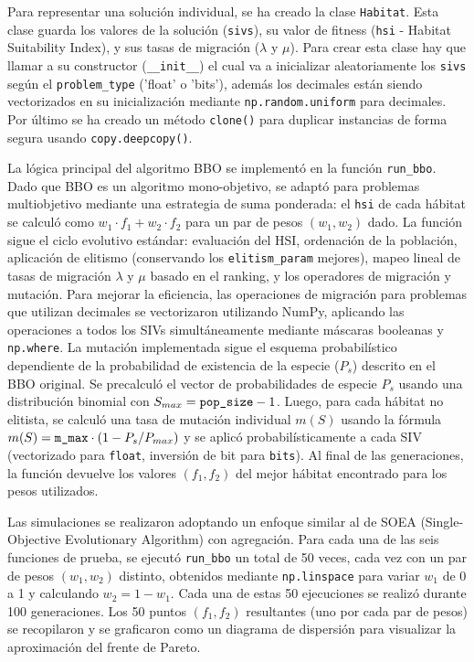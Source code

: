 Para representar una solución individual, se ha creado la clase \verb|Habitat|. Esta clase guarda los valores de la solución (\verb|sivs|), su valor de fitness (\verb|hsi| - Habitat Suitability Index), y sus tasas de migración ($\lambda$ y $\mu$). Para crear esta clase hay que llamar a su constructor (\verb|__init__|) el cual va a inicializar aleatoriamente los \verb|sivs| según el \verb|problem_type| ('float' o 'bits'), además los decimales están siendo vectorizados en su inicialización mediante \verb|np.random.uniform| para decimales. Por último se ha creado un método \verb|clone()| para duplicar instancias de forma segura usando \verb|copy.deepcopy()|.

La lógica principal del algoritmo BBO se implementó en la función \verb|run_bbo|. Dado que BBO es un algoritmo mono-objetivo, se adaptó para problemas multiobjetivo mediante una estrategia de suma ponderada: el \verb|hsi| de cada hábitat se calculó como $w_1 \cdot f_1 + w_2 \cdot f_2$ para un par de pesos $(w_1, w_2)$ dado. La función sigue el ciclo evolutivo estándar: evaluación del HSI, ordenación de la población, aplicación de elitismo (conservando los \verb|elitism_param| mejores), mapeo lineal de tasas de migración $\lambda$ y $\mu$ basado en el ranking, y los operadores de migración y mutación. Para mejorar la eficiencia, las operaciones de migración para problemas que utilizan decimales se vectorizaron utilizando NumPy, aplicando las operaciones a todos los SIVs simultáneamente mediante máscaras booleanas y \verb|np.where|. La mutación implementada sigue el esquema probabilístico dependiente de la probabilidad de existencia de la especie ($P_s$) descrito en el BBO original. Se precalculó el vector de probabilidades de especie $P_s$ usando una distribución binomial con $S_{max} = \verb|pop_size| - 1$. Luego, para cada hábitat no elitista, se calculó una tasa de mutación individual $m(S)$ usando la fórmula $m(S) = \verb|m_max| \cdot (1 - P_s / P_{max})$ y se aplicó probabilísticamente a cada SIV (vectorizado para \verb|float|, inversión de bit para \verb|bits|). Al final de las generaciones, la función devuelve los valores $(f_1, f_2)$ del mejor hábitat encontrado para los pesos utilizados.

Las simulaciones se realizaron adoptando un enfoque similar al de SOEA (Single-Objective Evolutionary Algorithm) con agregación. Para cada una de las seis funciones de prueba, se ejecutó \verb|run_bbo| un total de 50 veces, cada vez con un par de pesos $(w_1, w_2)$ distinto, obtenidos mediante \verb|np.linspace| para variar $w_1$ de 0 a 1 y calculando $w_2 = 1 - w_1$. Cada una de estas 50 ejecuciones se realizó durante 100 generaciones. Los 50 puntos $(f_1, f_2)$ resultantes (uno por cada par de pesos) se recopilaron y se graficaron como un diagrama de dispersión para visualizar la aproximación del frente de Pareto.

